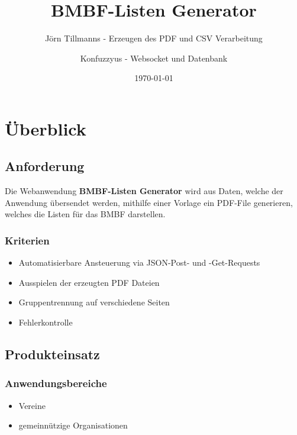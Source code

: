 \documentclass[12pt,parskip=full, pagea4]{scrreprt}
\begin{document}
	\title{BMBF-Listen Generator}
	\date{\today}
	\author{Jörn Tillmanns - Erzeugen des PDF und CSV Verarbeitung \and
	Konfuzzyus - Websocket und Datenbank}
	
	\maketitle
	
	\clearpage

	\tableofcontents
	
	\part{\"Uberblick}
		
		\chapter{Anforderung}
			Die Webanwendung \textbf{BMBF-Listen Generator} wird aus Daten, welche der Anwendung übersendet werden, mithilfe einer Vorlage ein PDF-File generieren, welches die Listen für das BMBF darstellen.
			
			\section{Kriterien}
			
			\begin{itemize}
				\item Automatisierbare Ansteuerung via JSON-Post- und -Get-Requests
				\item Ausspielen der erzeugten PDF Dateien
				\item Gruppentrennung auf verschiedene Seiten
				\item Fehlerkontrolle
			\end{itemize}
			
		\chapter{Produkteinsatz}
		
			\section{Anwendungsbereiche}
			
			\begin{itemize}
				\item Vereine
				\item gemeinnützige Organisationen
			\end{itemize}
			
\end{document}
